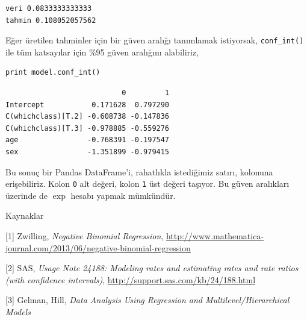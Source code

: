\documentclass[12pt,fleqn]{article}\usepackage{../../common}
\begin{document}
\begin{verbatim}
veri 0.0833333333333
tahmin 0.108052057562
\end{verbatim}

Eğer üretilen tahminler için bir güven aralığı tanımlamak istiyorsak,
\verb!conf_int()! ile tüm katsayılar için \%95 güven aralığını alabiliriz,

\begin{verbatim}
print model.conf_int()
\end{verbatim}

\begin{verbatim}
                           0         1
Intercept           0.171628  0.797290
C(whichclass)[T.2] -0.608738 -0.147836
C(whichclass)[T.3] -0.978885 -0.559276
age                -0.768391 -0.197547
sex                -1.351899 -0.979415
\end{verbatim}

Bu sonuç bir Pandas DataFrame'i, rahatlıkla istediğimiz satırı, kolonuna
erişebiliriz. Kolon \verb!0! alt değeri, kolon \verb!1! üst değeri
taşıyor. Bu güven aralıkları üzerinde de $\exp$ hesabı yapmak mümkündür. 

Kaynaklar

[1] Zwilling, {\em Negative Binomial Regression}, \url{http://www.mathematica-journal.com/2013/06/negative-binomial-regression}

[2] SAS, {\em Usage Note 24188: Modeling rates and estimating rates and rate
  ratios (with confidence intervals)}, \url{http://support.sas.com/kb/24/188.html}

[3] Gelman, Hill, {\em Data Analysis Using Regression and Multilevel/Hierarchical Models}
\end{document}
